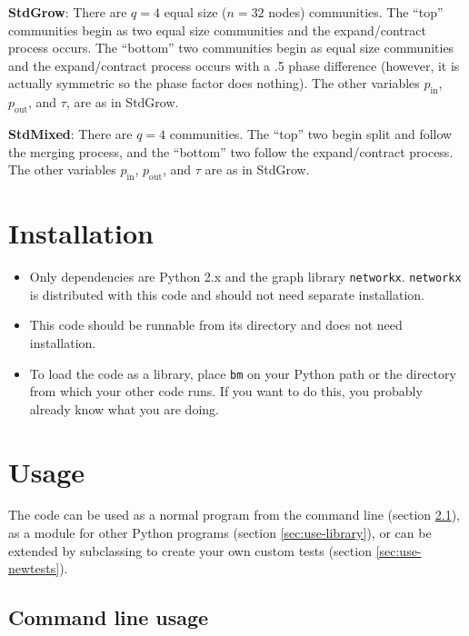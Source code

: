 \documentclass{article}
\def\pin{p_\mathrm{in}}
\def\pout{p_\mathrm{out}}
\begin{document}
\textbf{StdGrow}: There are $q=4$ equal size ($n=32$ nodes)
communities.  The ``top'' communities begin as two equal size
communities and the expand/contract process occurs.  The ``bottom''
two communities begin as equal size communities and the
expand/contract process occurs with a .5 phase difference (however,
it is actually symmetric so the phase factor does nothing).  The other
variables $\pin$, $\pout$, and $\tau$, are as in StdGrow.

\textbf{StdMixed}: There are $q=4$ communities.  The ``top'' two begin
split and follow the merging process, and the ``bottom'' two follow
the expand/contract process.  The other variables $\pin$, $\pout$, and
$\tau$ are as in StdGrow.





\section{Installation}


\begin{itemize}
\item Only dependencies are Python 2.x and the graph library
  \texttt{networkx}.  \texttt{networkx} is distributed with this code
  and should not need separate installation.
\item This code should be runnable from its directory and does not
  need installation.
\item To load the code as a library, place \texttt{bm} on your Python
  path or the directory from which your other code runs.  If you want
  to do this, you probably already know what you are doing.
\end{itemize}





\section{Usage}

The code can be used as a normal program from the command line
(section \ref{sec:use-cli}), as a module for other Python programs
(section \ref{sec:use-library}), or can be extended by subclassing to
create your own custom tests (section \ref{sec:use-newtests}).




\subsection{Command line usage}
\label{sec:use-cli}
\end{document}
